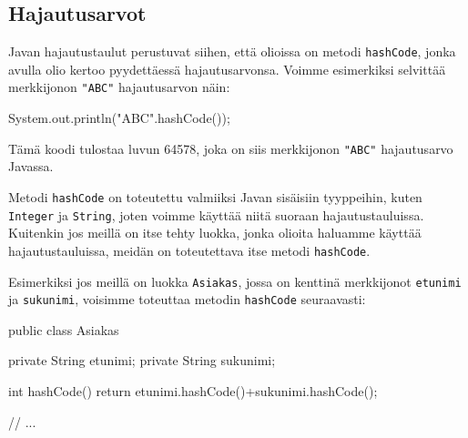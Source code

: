 \subsection{Hajautusarvot}

Javan hajautustaulut perustuvat siihen, että olioissa
on metodi \texttt{hashCode}, jonka avulla olio kertoo
pyydettäessä hajautusarvonsa.
Voimme esimerkiksi selvittää merkkijonon \texttt{"ABC"}
hajautusarvon näin:

\begin{code}
System.out.println("ABC".hashCode());
\end{code}

Tämä koodi tulostaa luvun 64578,
joka on siis merkkijonon \texttt{"ABC"} hajautusarvo Javassa.

Metodi \texttt{hashCode} on toteutettu valmiiksi Javan
sisäisiin tyyppeihin, kuten \texttt{Integer} ja \texttt{String},
joten voimme käyttää niitä suoraan hajautustauluissa.
Kuitenkin jos meillä on itse tehty luokka, jonka olioita
haluamme käyttää hajautustauluissa, meidän on toteutettava
itse metodi \texttt{hashCode}.

Esimerkiksi jos meillä on luokka \texttt{Asiakas},
jossa on kenttinä merkkijonot
\texttt{etunimi} ja \texttt{sukunimi},
voisimme toteuttaa metodin \texttt{hashCode} seuraavasti:

\begin{code}
public class Asiakas {
    private String etunimi;
    private String sukunimi;

    int hashCode() {
        return etunimi.hashCode()+sukunimi.hashCode();
    }

    // ...
}
\end{code}
